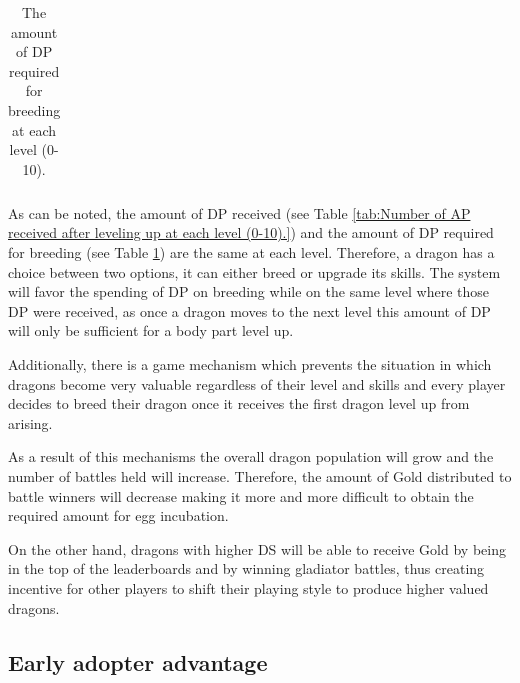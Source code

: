 \documentclass[12pt]{article}
\begin{document}
{\begin{table}[!ht]
\begin{tabular}{p{0.81in}p{2.59in}}
\end{tabular}\caption{The amount of DP required for breeding at each level (0-10).}
\label{tab:The amount of AP required for breeding at each level (0-10).}

 \end{table}



\setlength{\parskip}{0.0pt}
\begin{FlushLeft}

\end{FlushLeft}\par


\vspace{\baselineskip}
\setlength{\parskip}{9.96pt}
As can be noted, the amount of DP received (see  Table \ref{tab:Number of AP received after leveling up at each level  (0-10).}) and the amount of DP required for breeding (see Table \ref{tab:The amount of AP required for breeding at each level (0-10).}) are the same at each level. Therefore, a dragon has a choice between two options, it can either breed or upgrade its skills. The system will favor the spending of DP on breeding while on the same level where those DP were received, as once a dragon moves to the next level this amount of DP will only be sufficient for a body part level up.\par

Additionally, there is a game mechanism which prevents the situation in which dragons become very valuable regardless of their level and skills and every player decides to breed their dragon once it receives the first dragon level up from arising.\par

As a result of this mechanisms the overall dragon population will grow and the number of battles held will increase. Therefore, the amount of Gold distributed to battle winners will decrease making it more and more difficult to obtain the required amount for egg incubation.\par

On the other hand, dragons with higher DS\textit{ }will be able to receive Gold by being in the top of the leaderboards and by winning gladiator battles, thus creating incentive for other players to shift their playing style to produce higher valued dragons.\par

\subsection{Early adopter advantage}
\label{Early adopter advantage} \par

}
\end{document}
